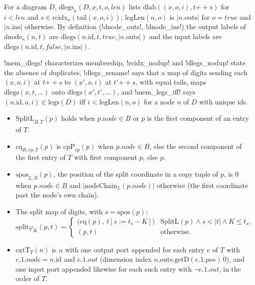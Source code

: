 \begin{definition}
For a diagram $D$, $\mathrm{dlegs}_\kappa(D,x,t,o,\mathit{len})$ lists $\mathrm{dlab}((x,o,i),t\mathbin{+\!\!+}s)$ for $i<\mathit{len}$ and $s\in\mathrm{rcidx}_\kappa(\mathrm{tail}(x,o,i))$; $\mathrm{legLen}(n,o)$ is $|n.\mathrm{outs}|$ for $o=\mathit{true}$ and $|n.\mathrm{ins}|$ otherwise. By definition (\lean!dnode_outs!, \lean!dnode_ins!) the output labels of $\mathrm{dnode}_\kappa(n,t)$ are $\mathrm{dlegs}(n.\mathrm{id},t,\mathit{true},|n.\mathrm{outs}|)$ and the input labels are $\mathrm{dlegs}(n.\mathrm{id},t,\mathit{false},|n.\mathrm{ins}|)$.
\end{definition}

\lean!mem_dlegs! characterizes membership, \lean!rcidx_nodup! and \lean!dlegs_nodup! state the absence of duplicates, \lean!dlegs_rename! says that a map of digits sending each $(x,o,i)$ at $t\mathbin{+\!\!+}s$ to $(x',o,i)$ at $t'\mathbin{+\!\!+}s$, with equal tails, maps $\mathrm{dlegs}(x,t,\ldots)$ onto $\mathrm{dlegs}(x',t',\ldots)$, and \lean!mem_legs_iff! says $(n.\mathrm{id},o,i)\in\mathrm{legs}(D)$ iff $i<\mathrm{legLen}(n,o)$ for a node $n$ of $D$ with unique ids.

\begin{definition}\label{def:lean-sym-split-map}
\begin{itemize}
\item $\mathrm{SplitL}_{B,T}(p)$ holds when $p.\mathit{node}\in B$ or $p$ is the first component of an entry of $T$.
\item $\mathrm{cq}_{B,\mathrm{cp},T}(p)$ is $\mathrm{cpP}_{\mathrm{cp}}(p)$ when $p.\mathit{node}\in B$, else the second component of the first entry of $T$ with first component $p$, else $p$.
\item $\mathrm{spos}_{L,B}(p)$, the position of the split coordinate in a copy tuple of $p$, is $0$ when $p.\mathit{node}\in B$ and $|\mathrm{nodeChain}_L(p.\mathit{node})|$ otherwise (the first coordinate past the node's own chain).
\item The split map of digits, with $s=\mathrm{spos}(p)$:
\[
\mathrm{split}\varphi_K(p,t)=\begin{cases}\bigl(\mathrm{cq}(p),\ t[s:=t_s-K]\bigr)&\mathrm{SplitL}(p)\land s<|t|\land K\le t_s,\\(p,t)&\text{otherwise.}\end{cases}
\]
\item $\mathrm{extT}_T(n)$ is $n$ with one output port appended for each entry $e$ of $T$ with $e.1.\mathit{node}=n.\mathrm{id}$ and $e.1.\mathit{out}$ (dimension index $n.\mathrm{outs.getD}(e.1.\mathit{pos})\,0$), and one input port appended likewise for each such entry with $\lnot e.1.\mathit{out}$, in the order of $T$.
\end{itemize}
\end{definition}


